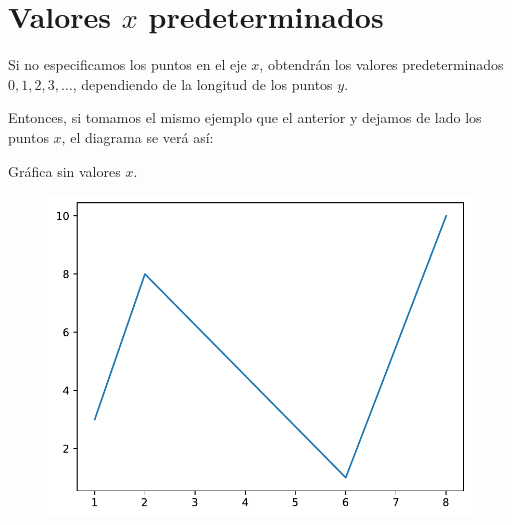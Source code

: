 \section{\texorpdfstring{Valores \(x\) predeterminados}{Valores x predeterminados}}

Si no especificamos los puntos en el eje \(x\), obtendrán los valores
predeterminados \(0, 1, 2, 3, \dots\), dependiendo de la longitud de los
puntos \(y\).

Entonces, si tomamos el mismo ejemplo que el anterior y dejamos de lado
los puntos \(x\), el diagrama se verá así:\\

\begin{code} Gráfica sin valores \(x\).

\begin{Shaded}
\begin{Highlighting}[]

\OperatorTok{=}\NormalTok{ np.array([}\NormalTok{, }\NormalTok{, }\NormalTok{, }\NormalTok{, }\NormalTok{, }\NormalTok{])}

\end{Highlighting}
\end{Shaded}

\begin{figure}
  \centering
  \includegraphics[scale=0.6]{img/grafica1004.pdf}
\end{figure}
\end{code}

